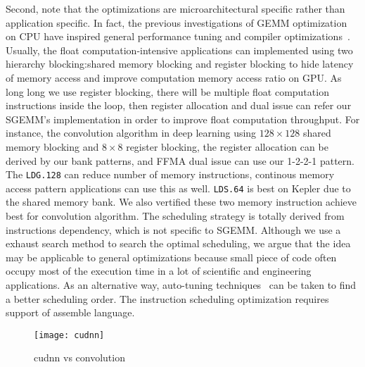 Second, note that the optimizations are microarchitectural specific rather than application specific. In fact, the previous investigations of GEMM optimization on CPU have inspired general performance tuning and compiler optimizations~\cite{lam1991cache}.  
Usually, the float computation-intensive applications can implemented using two hierarchy blocking:shared memory blocking and register blocking to hide latency of memory access and improve computation memory access ratio on GPU. As long long we use register blocking, there will be multiple float computation instructions inside the loop, then register allocation  and dual issue can refer our SGEMM's implementation in order to improve float computation throughput. For instance, the convolution algorithm in deep learning using $128\times128$ shared memory blocking and $8\times8$ register blocking, the register allocation can be derived by our bank patterns, and FFMA dual issue can use our 1-2-2-1 pattern. The {\tt LDG.128} can reduce number of memory instructions, continous memory access pattern applications can use this as well.
{\tt LDS.64} is best on Kepler due to the shared memory bank. We also vertified these two memory instruction achieve best for convolution algorithm.
The scheduling strategy is totally derived from instructions dependency,
which is not specific to SGEMM. Although we use a exhaust search method to search the optimal scheduling, we
argue that the idea may be applicable to general optimizations
because small piece of code often occupy most of the
execution time in a lot of scientific and engineering applications.
As an alternative way, auto-tuning techniques~\cite{} 
can be taken to find a better scheduling order. The instruction
scheduling optimization requires support of assemble language.
\begin{figure}[htbp]
\begin{center}
\texttt{[image: cudnn]}
\caption{cudnn vs convolution}
\label{fig:sgemm_tn}
\end{center}
\end{figure}
